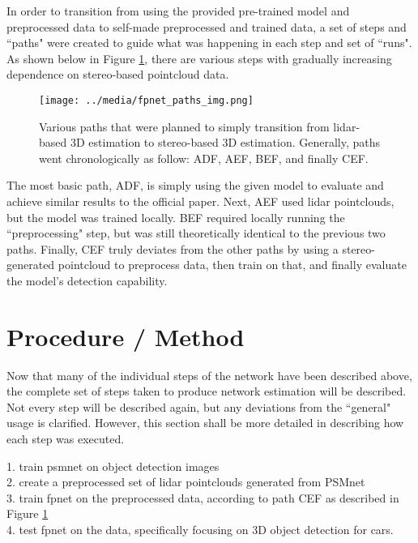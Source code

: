 In order to transition from using the provided pre-trained model and preprocessed data to self-made preprocessed and trained data, a set of steps and ``paths" were created to guide what was happening in each step and set of ``runs". As shown below in Figure \ref{fp_paths}, there are various steps with gradually increasing dependence on stereo-based pointcloud data.

\begin{figure}[h]
    \texttt{[image: ../media/fpnet\_paths\_img.png]}
    \caption{Various paths that were planned to simply transition from lidar-based 3D estimation to stereo-based 3D estimation. Generally, paths went chronologically as follow: ADF, AEF, BEF, and finally CEF.}
    \label{fp_paths} 
\end{figure}

The most basic path, ADF, is simply using the given model to evaluate and achieve similar results to the official paper. Next, AEF used lidar pointclouds, but the model was trained locally. BEF required locally running the ``preprocessing" step, but was still theoretically identical to the previous two paths. Finally, CEF truly deviates from the other paths by using a stereo-generated pointcloud to preprocess data, then train on that, and finally evaluate the model's detection capability. 


\newpage
\section{Procedure / Method}
Now that many of the individual steps of the network have been described above, the complete set of steps taken to produce network estimation will be described. Not every step will be described again, but any deviations from the ``general" usage is clarified. However, this section shall be more detailed in describing how each step was executed.

1. train psmnet on object detection images\\
2. create a preprocessed set of lidar pointclouds generated from PSMnet \\
3. train fpnet on the preprocessed data, according to path CEF as described in Figure \ref{fp_paths} \\
4. test fpnet on the data, specifically focusing on 3D object detection for cars. \\


\newpage
